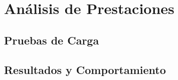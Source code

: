 \chapter{Análisis de Prestaciones}

\section{Pruebas de Carga}

\section{Resultados y Comportamiento}
